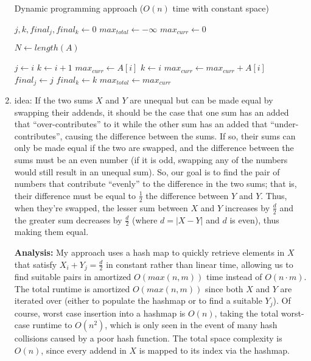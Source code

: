 \documentclass[12pt]{article}
\begin{document}
\begin{enumerate}
    \begin{algorithm}
        \caption{Dynamic programming approach ($O(n)$ time with constant space)}
        \begin{algorithmic}
            \State $j, k, final_j, final_k \gets 0$
            \State $max_{total} \gets -\infty$
            \State $max_{curr} \gets 0$
            
            \State $N \gets length(A)$
            
                    \State $j \gets i$
                    \State $k \gets i + 1$
                    \State $max_{curr} \gets A[i]$
                \Else
                    \State $k \gets i$
                    \State $max_{curr} \gets max_{curr} + A[i]$
                    \State $final_j \gets j$
                    \State $final_k \gets k$
                    \State $max_{total} \gets max_{curr}$
                    \EndIf
                \EndIf
            \EndFor
        \end{algorithmic}
    \end{algorithm}
    
    \item idea: If the two sums $X$ and $Y$ are unequal but can be made equal by swapping their addends, it should be the 
    case that one sum has an added that ``over-contributes'' to it while the other sum has an added that ``under-contributes'', causing the 
    difference between the sums. If so, their sums can only be made equal if the two are swapped, and the difference between the sums must 
    be an even number (if it is odd, swapping any of the numbers would still result in an unequal sum). So, our goal is to 
    find the pair of numbers that contribute ``evenly'' to the difference in the two sums; that is, their difference must be 
    equal to $\frac{1}{2}$ the difference between $Y$ and $Y$. Thus, when they're swapped, the lesser sum between $X$ and $Y$ 
    increases by $\frac{d}{2}$ and the greater sum decreases by $\frac{d}{2}$ (where $d = |X - Y|$ and $d$ is even), thus making them equal.

    \textbf{Analysis:} My approach uses a hash map to quickly retrieve elements in $X$ that satisfy $X_i + Y_j = \frac{d}{2}$ in 
    constant rather than linear time, allowing us to find suitable pairs in amortized $O(max(n, m))$ time instead of $O(n \cdot m)$.
    The total runtime is amortized $O(max(n, m))$ since both $X$ and $Y$ are iterated over (either to populate the hashmap or to find a suitable $Y_j$). Of course, worst 
    case insertion into a hashmap is $O(n)$, taking the total worst-case runtime to $O(n^2)$, which is only seen in the event of 
    many hash collisions caused by a poor hash function. The total space complexity is $O(n)$, since every addend in $X$ is mapped to its index via the hashmap.


\end{enumerate}
\end{document}

